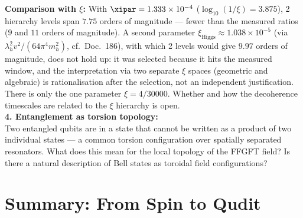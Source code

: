 \begin{significance}
\textbf{Comparison with $\xi$:} With $\xipar = 1.333\times10^{-4}$ ($\log_{10}(1/\xi) = 3.875$), 2 hierarchy levels span $7.75$ orders of magnitude --- fewer than the measured ratios ($9$ and $11$ orders of magnitude).
A second parameter $\xi_\text{Higgs} \approx 1.038\times10^{-5}$ (via $\lambda_h^2 v^2/(64\pi^4 m_h^2)$, cf.\ Doc.~186), with which 2 levels would give $9.97$ orders of magnitude, does not hold up: it was selected because it hits the measured window, and the interpretation via two separate $\xi$ spaces (geometric and algebraic) is rationalisation after the selection, not an independent justification. There is only the one parameter $\xi = 4/30000$.
Whether and how the decoherence timescales are related to the $\xi$ hierarchy is open.\\[6pt]

\textbf{4. Entanglement as torsion topology:}\\
Two entangled qubits are in a state
that cannot be written as a product of two individual states ---
a common torsion configuration
over spatially separated resonators.
What does this mean for the local topology
of the FFGFT field?
Is there a natural description of Bell states
as toroidal field configurations?
\end{significance}

\section{Summary: From Spin to Qudit}
\label{sec:summary-174}

